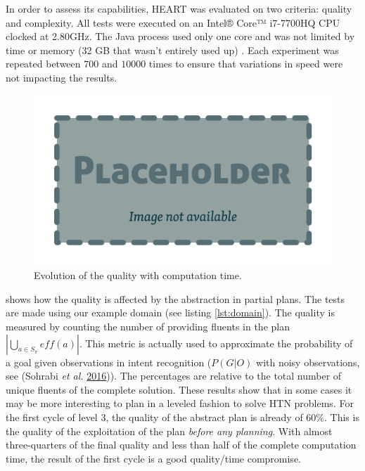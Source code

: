 \documentclass[11pt,a4paper,twoside,openright,titlepage,numbers=noenddot,headinclude,cleardoublepage=empty,openany]{scrreprt}
\theoremstyle{plain}
\theoremstyle{definition}
\theoremstyle{remark}
\begin{document}
In order to assess its capabilities, HEART was evaluated on two
criteria: quality and complexity. All tests were executed on an Intel®
Core™ i7-7700HQ CPU clocked at 2.80GHz. The Java process used only one
core and was not limited by time or memory (32 GB that wasn't entirely
used up) . Each experiment was repeated between \(700\) and \(10 000\)
times to ensure that variations in speed were not impacting the results.

\begin{figure}
\hypertarget{fig:quality}{%
\centering
\includegraphics{./tex2pdf.-0b80fea6fd6da7f9/85c5abcb21612ede4db12ac6fcfd32ed24ed57eb.pdf}
\caption{Evolution of the quality with computation
time.}\label{fig:quality}
}
\end{figure}

 shows how the quality is affected by the abstraction
in partial plans. The tests are made using our example domain (see
listing \ref{lst:domain}). The quality is measured by counting the
number of providing fluents in the plan
\(\left| \bigcup_{a \in S_\pi} \mathit{eff}(a) \right|\). This metric is
actually used to approximate the probability of a goal given
observations in intent recognition (\(P(G|O)\) with noisy observations,
see (Sohrabi \emph{et al.}
\protect\hyperlink{ref-sohrabi_plan_2016}{2016})). The percentages are
relative to the total number of unique fluents of the complete solution.
These results show that in some cases it may be more interesting to plan
in a leveled fashion to solve HTN problems. For the first cycle of level
\(3\), the quality of the abstract plan is already of \(60\%\). This is
the quality of the exploitation of the plan \emph{before any planning}.
With almost three-quarters of the final quality and less than half of
the complete computation time, the result of the first cycle is a good
quality/time compromise.
\end{document}
